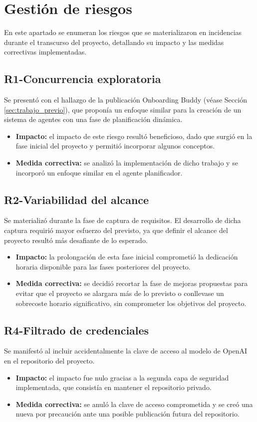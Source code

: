   \section{Gestión de riesgos}
  En este apartado se enumeran los riesgos que se materializaron en incidencias durante el transcurso del proyecto, detallando su impacto y las medidas correctivas implementadas.

  \subsection{R1-Concurrencia exploratoria}
  Se presentó con el hallazgo de la publicación Onboarding Buddy \cite{ionescu_multi-agent_2025} (véase Sección \ref{sec:trabajo_previo}), que proponía un enfoque similar para la creación de un sistema de agentes con una fase de planificación dinámica.
  \begin{itemize}
    \item\textbf{Impacto: }el impacto de este riesgo resultó beneficioso, dado que surgió en la fase inicial del proyecto y permitió incorporar algunos conceptos.
    \item\textbf{Medida correctiva: }se analizó la implementación de dicho trabajo y se incorporó un enfoque similar en el agente planificador.
  \end{itemize}

  \subsection{R2-Variabilidad del alcance}
Se materializó durante la fase de captura de requisitos. El desarrollo de dicha captura requirió mayor esfuerzo del previsto, ya que definir el alcance del proyecto resultó más desafiante de lo esperado.
  \begin{itemize}
  \item\textbf{Impacto: }la prolongación de esta fase inicial comprometió la dedicación horaria disponible para las fases posteriores del proyecto.
    \item\textbf{Medida correctiva: }se decidió recortar la fase de mejoras propuestas para evitar que el proyecto se alargara más de lo previsto o conllevase un sobrecoste horario significativo, sin comprometer los objetivos del proyecto.   
  \end{itemize}

  \subsection{R4-Filtrado de credenciales}
  Se manifestó al incluir accidentalmente la clave de acceso al modelo de OpenAI en el repositorio del proyecto.
  \begin{itemize}
  \item\textbf{Impacto: }el impacto fue nulo gracias a la segunda capa de seguridad implementada, que consistía en mantener el repositorio privado.
  \item\textbf{Medida correctiva: }se anuló la clave de acceso comprometida y se creó una nueva por precaución ante una posible publicación futura del repositorio.
  \end{itemize}
